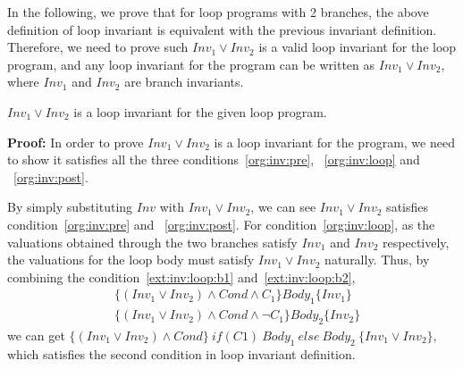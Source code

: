 In the following, we prove that for loop programs with 2 branches,
the above definition of loop invariant is equivalent with the previous invariant definition.
Therefore, we need to prove such $Inv_1 \vee Inv_2$ is a valid loop invariant for the loop program,
and any loop invariant for the program can be written as $Inv_1 \vee Inv_2$, where $Inv_1$ and $Inv_2$ are branch invariants.


\begin{theorem}
\label{thm:disjunctive:is:invariant}
	$Inv_1 \vee Inv_2$ is a loop invariant for the given loop program.
\end{theorem}

\noindent \textbf{Proof:} In order to prove $Inv_1 \vee Inv_2$ is a loop invariant for the program,
we need to show it satisfies all the three conditions~\ref{org:inv:pre}, ~\ref{org:inv:loop} and ~\ref{org:inv:post}.

By simply substituting $Inv$ with  $Inv_1 \vee Inv_2$,
we can see $Inv_1 \vee Inv_2$ satisfies condition~\ref{org:inv:pre} and ~\ref{org:inv:post}.
For condition~\ref{org:inv:loop},
as the valuations obtained through the two branches satisfy $Inv_1$ and $Inv_2$ respectively,
the valuations for the loop body must satisfy $Inv_1 \vee Inv_2$ naturally.
Thus, by combining the condition~\ref{ext:inv:loop:b1} and~\ref{ext:inv:loop:b2},
\begin{align*}
&\{(Inv_1 \vee Inv_2) \wedge Cond \wedge C_1\} Body_1 \{Inv_1\} \\
&\{(Inv_1 \vee Inv_2) \wedge Cond \wedge \neg C_1\} Body_2 \{Inv_2\}
\end{align*}
we can get $\{(Inv_1 \vee Inv_2) \wedge Cond\}~if (C1)~{Body_1}~else~{Body_2}~\{Inv_1 \vee Inv_2\}$,
which satisfies the second condition in loop invariant definition.

